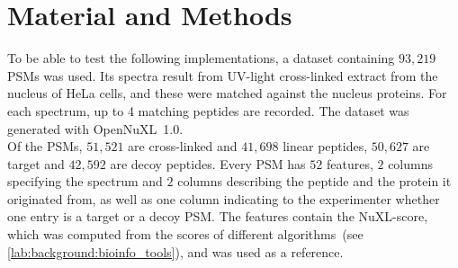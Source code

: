 
\chapter{Material and Methods}
\label{matmet}
\label{lab:matmet:dataset}
To be able to test the following implementations, a dataset containing $93,219$ PSMs was used. Its spectra result from UV-light cross-linked extract from the nucleus of HeLa cells, and these were matched against the nucleus proteins. For each spectrum, up to 4 matching peptides are recorded. The dataset was generated with OpenNuXL~1.0.\\
Of the PSMs, $51,521$ are cross-linked and $41,698$ linear peptides, $50,627$ are target and $42,592$ are decoy peptides. Every PSM has $52$ features, $2$ columns specifying the spectrum and $2$ columns describing the peptide and the protein it originated from, as well as one column indicating to the experimenter whether one entry is a target or a decoy PSM. The features contain the NuXL-score, which was computed from the scores of different algorithms~(see \ref{lab:background:bioinfo_tools}), and was used as a reference.
\renewcommand{\baselinestretch}{0.9}
